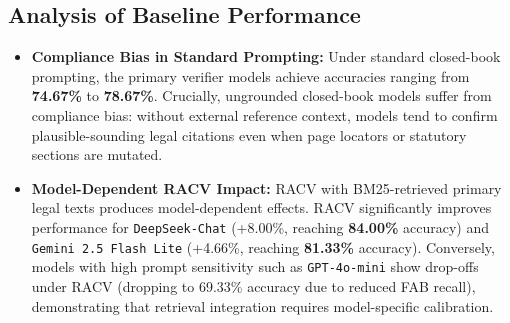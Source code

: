 \documentclass[conference]{IEEEtran}
\begin{document}
\subsection{Analysis of Baseline Performance}
\begin{itemize}
\item \textbf{Compliance Bias in Standard Prompting:} Under standard closed-book prompting, the primary verifier models achieve accuracies ranging from \textbf{74.67\%} to \textbf{78.67\%}. Crucially, ungrounded closed-book models suffer from compliance bias: without external reference context, models tend to confirm plausible-sounding legal citations even when page locators or statutory sections are mutated.
\item \textbf{Model-Dependent RACV Impact:} RACV with BM25-retrieved primary legal texts produces model-dependent effects. RACV significantly improves performance for \texttt{DeepSeek-Chat} (+8.00\%, reaching \textbf{84.00\%} accuracy) and \texttt{Gemini 2.5 Flash Lite} (+4.66\%, reaching \textbf{81.33\%} accuracy). Conversely, models with high prompt sensitivity such as \texttt{GPT-4o-mini} show drop-offs under RACV (dropping to 69.33\% accuracy due to reduced FAB recall), demonstrating that retrieval integration requires model-specific calibration.
\end{itemize}

\begin{table}[htbp]
\caption{Full 7-Candidate Model Suite Comparison Across Verification Settings ($N=150$)}
\label{tab:full_suite_metrics}
\centering
{}
\end{table}
\end{document}
